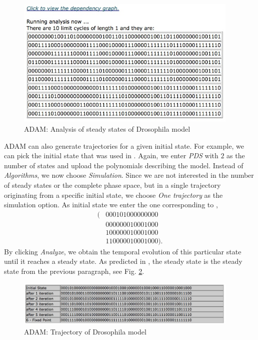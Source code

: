 \documentclass[11pt]{amsart}
\begin{document}
\begin{figure}[htb]
\centering
\includegraphics[width=0.95\textwidth]{DroAlgOutput.jpg}
\caption{ADAM: Analysis of steady states of Drosophila model}
\label{fig:alg}
\end{figure}
ADAM can also generate trajectories for a given initial state. For example, we
can pick the initial state that was used in \cite[Figure 4(a)]{AO}. Again, we
enter {\it PDS} with $2$ as the number of states and upload the polynomials
describing the model. Instead of {\it Algorithms}, we now choose {\it
Simulation}. Since we are not interested in the number of steady states or the
complete phase space, but in a single trajectory originating from a specific
initial state,  we choose {\it One trajectory} as the simulation option. As
initial state we enter the one corresponding to \cite[Figure 4(a)]{AO},
\begin{align*}
(&0 0 0 1 0 1 0 0 0 0 0 0 0 0 0\\
&0 0 0 0 0 0 0 1 0 0 0 1 0 0 0\\
&1 0 0 0 0 0 0 1 0 0 0 1 0 0 0\\
&1 1 0 0 0 0 0 1 0 0 0 1 0 0 0).
\end{align*}
By clicking {\it Analyze}, we obtain the temporal evolution of this particular
state until it reaches a steady state. As predicted in \cite{AO}, the
steady state is the steady state from the previous paragraph, see Fig.
\ref{fig:traj}.
\begin{figure}[htb]
\centering
\includegraphics[width=0.95\textwidth]{DroTraj.jpg}
\caption{ADAM: Trajectory of Drosophila model}
\label{fig:traj}
\end{figure}
\end{document}
